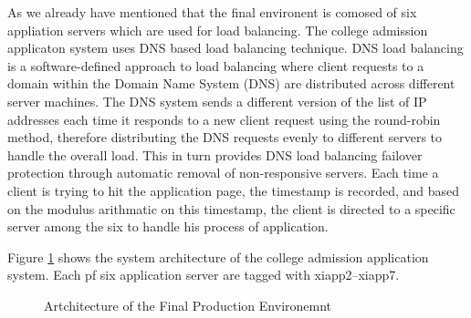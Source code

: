 \documentclass[sigconf,authordraft]{acmart}
\begin{document}
As we already have mentioned that the final environent is comosed of six appliation servers which are used for load balancing. The college admission applicaton system uses DNS based load balancing technique. 
DNS load balancing is a software-defined approach to load balancing where client requests to a domain within the Domain Name System (DNS) are distributed across different server machines. The DNS system sends a different version of the list of IP addresses each time it responds to a new client request using the round-robin method, therefore distributing the DNS requests evenly to different servers to handle the overall load. This in turn provides DNS load balancing failover protection through automatic removal of non-responsive servers. 
Each time a client is trying to hit the application page, the timestamp is recorded, and based on the modulus arithmatic on this timestamp, the client is directed to a specific server among the six to handle his process of application. 

Figure \ref{fig:architecture} shows the system architecture of the college admission application system. Each pf six application server are tagged with xiapp2--xiapp7. 

\begin{figure}[h]
	\centering
	\caption{Artchitecture of the Final Production Environemnt}
	\label{fig:architecture}
\end{figure}
\end{document}
